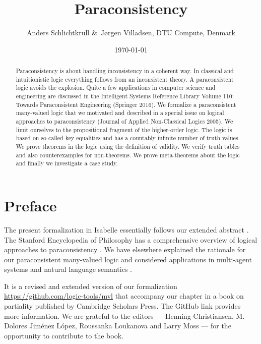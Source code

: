 \documentclass[11pt,a4paper]{article}
\title{Paraconsistency}
\author{Anders Schlichtkrull \&\ J{\o}rgen Villadsen, DTU Compute, Denmark}
\date{\isadate\today}
\renewcommand{\isamarkupsection}[1]{\section*{#1}\addcontentsline{toc}{section}{#1}}
\begin{document}
\makeatletter
\parbox[t]{\textwidth}{\centering\Huge\bfseries\@title}\par\kern5mm
\parbox[t]{\textwidth}{\centering\Large\bfseries\@author}\par\kern3mm
\parbox[t]{\textwidth}{\centering\bfseries\@date}\par\kern8mm
\makeatother

\begin{abstract}\normalsize\noindent
Paraconsistency is about handling inconsistency in a coherent way. In classical and intuitionistic
logic everything follows from an inconsistent theory. A paraconsistent logic avoids the explosion.
Quite a few applications in computer science and engineering are discussed in the Intelligent
Systems Reference Library Volume 110: Towards Paraconsistent Engineering (Springer 2016). We
formalize a paraconsistent many-valued logic that we motivated and described in a special issue on
logical approaches to paraconsistency (Journal of Applied Non-Classical Logics 2005). We limit
ourselves to the propositional fragment of the higher-order logic. The logic is based on so-called
key equalities and has a countably infinite number of truth values. We prove theorems in the logic
using the definition of validity. We verify truth tables and also counterexamples for non-theorems.
We prove meta-theorems about the logic and finally we investigate a case study.
\end{abstract}

\tableofcontents

\isamarkupsection{Preface}

The present formalization in Isabelle essentially follows our extended abstract \cite{Jensen+12}.
The Stanford Encyclopedia of Philosophy has a comprehensive overview of logical approaches to
paraconsistency \cite{Priest+15}. We have elsewhere explained the rationale for our paraconsistent
many-valued logic and considered applications in multi-agent systems and natural language semantics
\cite{Villadsen05-JANCL,Villadsen09,Villadsen10,Villadsen14}.

It is a revised and extended version of our formalization \url{https://github.com/logic-tools/mvl}
that accompany our chapter in a book on partiality published by Cambridge Scholars Press. The GitHub
link provides more information. We are grateful to the editors --- Henning Christiansen, M. Dolores
Jim\'{e}nez L\'{o}pez, Roussanka Loukanova and Larry Moss --- for the opportunity to contribute to
the book.


\end{document}
